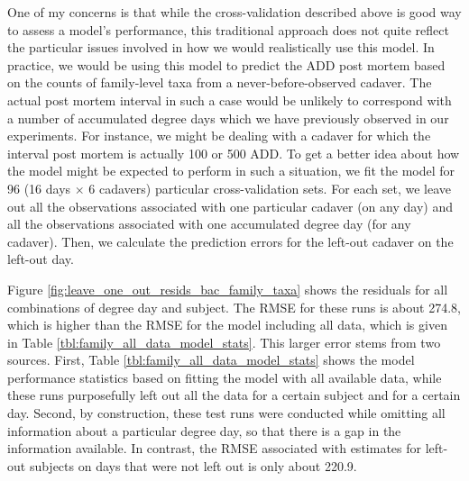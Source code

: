 \documentclass{article}
\begin{document}
One of my concerns is that while the cross-validation described above
is good way to assess a model's performance, this traditional approach
does not quite reflect the particular issues involved in how we would
realistically use this model.  In practice, we would be using this
model to predict the ADD post mortem based on the counts of
family-level taxa from a never-before-observed cadaver.  The actual
post mortem interval in such a case would be unlikely to correspond
with a number of accumulated degree days which we have previously
observed in our experiments.  For instance, we might be dealing with a
cadaver for which the interval post mortem is actually 100 or 500 ADD.
To get a better idea about how the model might be expected to perform
in such a situation, we fit the model for 96 (16 days $\times$ 6
cadavers) particular cross-validation sets.  For each set, we leave
out all the observations associated with one particular cadaver (on
any day) and all the observations associated with one accumulated
degree day (for any cadaver).  Then, we calculate the prediction
errors for the left-out cadaver on the left-out day.

Figure \ref{fig:leave_one_out_resids_bac_family_taxa} shows the
residuals for all combinations of degree day and subject.  The RMSE
for these runs is about 274.8, which is higher than the RMSE for the
model including all data, which is given in Table
\ref{tbl:family_all_data_model_stats}.  This larger error stems from
two sources.  First, Table \ref{tbl:family_all_data_model_stats} shows
the model performance statistics based on fitting the model with all
available data, while these runs purposefully left out all the data
for a certain subject and for a certain day.  Second, by construction,
these test runs were conducted while omitting all information about a
particular degree day, so that there is a gap in the information
available.  In contrast, the RMSE associated with estimates for
left-out subjects on days that were not left out is only about 220.9.
\end{document}
